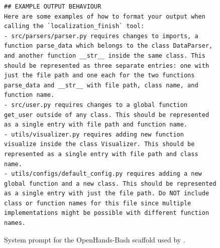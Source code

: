 \begin{figure}[!h]
\begin{tcolorbox}[colback=blue!6!white, colframe=blue!75!black, title=System Prompt for the OpenHands-Bash agent used by \methodname]
\begin{lstlisting}[basicstyle=\ttfamily\small, breaklines=true, columns=fullflexible]
## EXAMPLE OUTPUT BEHAVIOUR
Here are some examples of how to format your output when calling the `localization_finish` tool:
- src/parsers/parser.py requires changes to imports, a function parse_data which belongs to the class DataParser, and another function __str__ inside the same class. This should be represented as three separate entries: one with just the file path and one each for the two functions parse_data and __str__ with file path, class name, and function name.
- src/user.py requires changes to a global function get_user outside of any class. This should be represented as a single entry with file path and function name.
- utils/visualizer.py requires adding new function visualize inside the class Visualizer. This should be represented as a single entry with file path and class name.
- utils/configs/default_config.py requires adding a new global function and a new class. This should be represented as a single entry with just the file path. Do NOT include class or function names for this file since multiple implementations might be possible with different function names.
\end{lstlisting}
\end{tcolorbox}
\caption{System prompt for the OpenHands-Bash scaffold used by \methodname.}
\label{fig:system_prompt2}
\end{figure}



